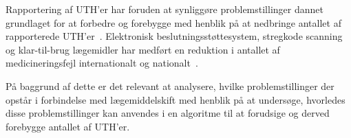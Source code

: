 Rapportering af UTH'er har foruden at synliggøre problemstillinger dannet grundlaget for at forbedre og forebygge med henblik på at nedbringe antallet af rapporterede UTH'er~. Elektronisk beslutningsstøttesystem, stregkode scanning og klar-til-brug lægemidler har medført en reduktion i antallet af medicineringsfejl internationalt og nationalt~\citep{Bates2013, Levtzion-korach2010, Amgros2012}.  

På baggrund af dette er det relevant at analysere, hvilke problemstillinger der opstår i forbindelse med lægemiddelskift med henblik på at undersøge, hvorledes disse problemstillinger kan anvendes i en algoritme til at forudsige og derved forebygge antallet af UTH'er.




